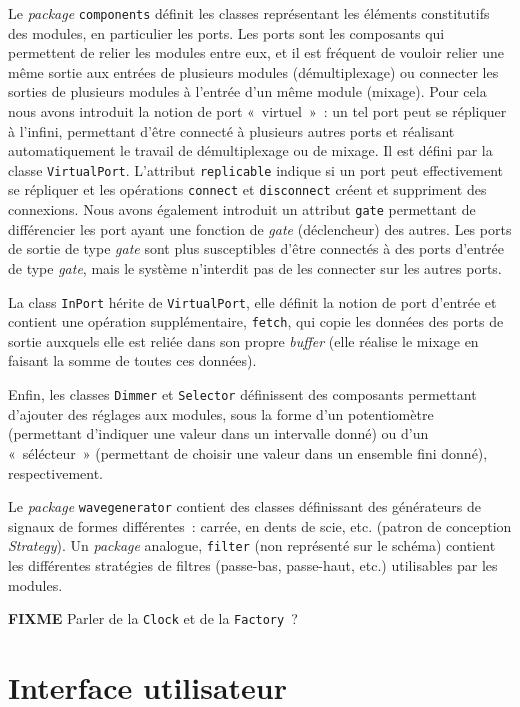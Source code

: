 Le \emph{package} \verb!components! définit les classes
représentant les éléments constitutifs des modules, en particulier
les ports. Les ports sont les composants qui permettent de relier
les modules entre eux, et il est fréquent de vouloir relier une
même sortie aux entrées de plusieurs modules (démultiplexage) ou
connecter les sorties de plusieurs modules à l'entrée d'un même
module (mixage). Pour cela nous avons introduit la notion de port
«~virtuel~»~: un tel port peut se répliquer à l'infini, permettant
d'être connecté à plusieurs autres ports et réalisant
automatiquement le travail de démultiplexage ou de mixage. Il est
défini par la classe \verb!VirtualPort!. L'attribut
\verb!replicable! indique si un port peut effectivement se
répliquer et les opérations \verb!connect! et \verb!disconnect!
créent et suppriment des connexions. Nous avons également introduit
un attribut \verb!gate! permettant de différencier les port ayant
une fonction de \emph{gate} (déclencheur) des autres. Les ports de
sortie de type \emph{gate} sont plus susceptibles d'être connectés
à des ports d'entrée de type \emph{gate}, mais le système
n'interdit pas de les connecter sur les autres ports.

La class \verb!InPort! hérite de \verb!VirtualPort!, elle définit
la notion de port d'entrée et contient une opération
supplémentaire, \verb!fetch!, qui copie les données des ports de
sortie auxquels elle est reliée dans son propre \emph{buffer} (elle
réalise le mixage en faisant la somme de toutes ces données).

Enfin, les classes \verb!Dimmer! et \verb!Selector! définissent des
composants permettant d'ajouter des réglages aux modules, sous la
forme d'un potentiomètre (permettant d'indiquer une valeur dans un
intervalle donné) ou d'un «~sélécteur~» (permettant de choisir une
valeur dans un ensemble fini donné), respectivement.

Le \emph{package} \verb!wavegenerator! contient des classes
définissant des générateurs de signaux de formes différentes~:
carrée, en dents de scie, etc. (patron de conception
\emph{Strategy}). Un \emph{package} analogue, \verb!filter! (non
représenté sur le schéma) contient les différentes stratégies de
filtres (passe-bas, passe-haut, etc.) utilisables par les modules.

\textbf{FIXME} Parler de la \verb!Clock! et de la \verb!Factory!~?

\section{Interface utilisateur}

